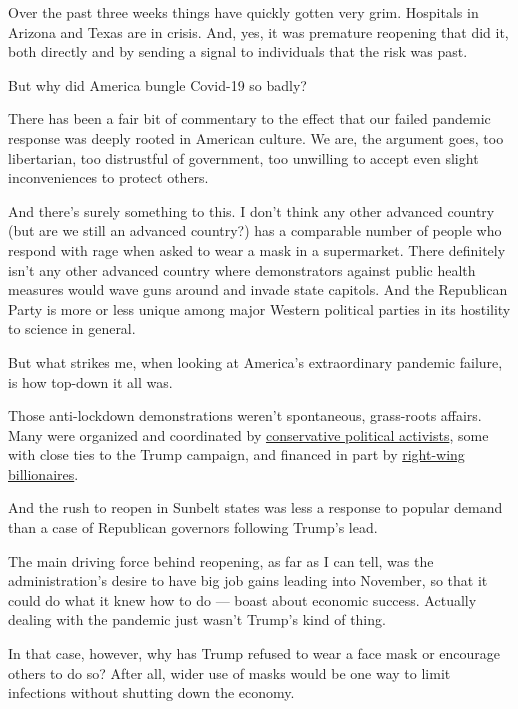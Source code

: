 Over the past three weeks things have quickly gotten very grim.
Hospitals in Arizona and Texas are in crisis. And, yes, it was premature
reopening that did it, both directly and by sending a signal to
individuals that the risk was past.

But why did America bungle Covid-19 so badly?

There has been a fair bit of commentary to the effect that our failed
pandemic response was deeply rooted in American culture. We are, the
argument goes, too libertarian, too distrustful of government, too
unwilling to accept even slight inconveniences to protect others.

And there's surely something to this. I don't think any other advanced
country (but are we still an advanced country?) has a comparable number
of people who respond with rage when asked to wear a mask in a
supermarket. There definitely isn't any other advanced country where
demonstrators against public health measures would wave guns around and
invade state capitols. And the Republican Party is more or less unique
among major Western political parties in its hostility to science in
general.

But what strikes me, when looking at America's extraordinary pandemic
failure, is how top-down it all was.

Those anti-lockdown demonstrations weren't spontaneous, grass-roots
affairs. Many were organized and coordinated by
\href{https://www.nytimes3xbfgragh.onion/2020/04/21/us/politics/coronavirus-protests-trump.html}{conservative
political activists}, some with close ties to the Trump campaign, and
financed in part by
\href{https://www.washingtonpost.com/politics/inside-the-conservative-networks-backing-anti-quarantine-protests/2020/04/22/da75c81e-83fe-11ea-a3eb-e9fc93160703_story.html}{right-wing
billionaires}.

And the rush to reopen in Sunbelt states was less a response to popular
demand than a case of Republican governors following Trump's lead.

The main driving force behind reopening, as far as I can tell, was the
administration's desire to have big job gains leading into November, so
that it could do what it knew how to do --- boast about economic
success. Actually dealing with the pandemic just wasn't Trump's kind of
thing.

In that case, however, why has Trump refused to wear a face mask or
encourage others to do so? After all, wider use of masks would be one
way to limit infections without shutting down the economy.

